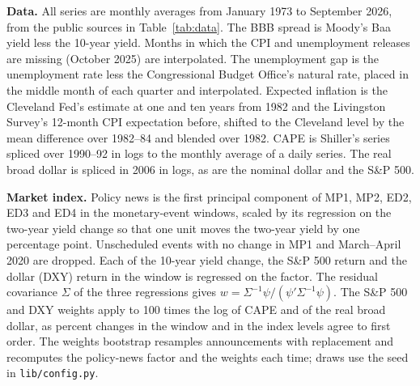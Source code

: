 \documentclass[11pt]{article}
\begin{document}
\begin{appendices}
\textbf{Data.} All series are monthly averages from January 1973 to September 2026, from the public sources in Table~\ref{tab:data}. The BBB spread is Moody's Baa yield less the 10-year yield. Months in which the CPI and unemployment releases are missing (October 2025) are interpolated. The unemployment gap is the unemployment rate less the Congressional Budget Office's natural rate, placed in the middle month of each quarter and interpolated. Expected inflation is the Cleveland Fed's estimate at one and ten years from 1982 and the Livingston Survey's 12-month CPI expectation before, shifted to the Cleveland level by the mean difference over 1982--84 and blended over 1982. CAPE is Shiller's series spliced over 1990--92 in logs to the monthly average of a daily series. The real broad dollar is spliced in 2006 in logs, as are the nominal dollar and the S\&P 500.

\textbf{Market index.} Policy news is the first principal component of MP1, MP2, ED2, ED3 and ED4 in the monetary-event windows, scaled by its regression on the two-year yield change so that one unit moves the two-year yield by one percentage point. Unscheduled events with no change in MP1 and March--April 2020 are dropped. Each of the 10-year yield change, the S\&P 500 return and the dollar (DXY) return in the window is regressed on the factor. The residual covariance $\Sigma$ of the three regressions gives $w=\Sigma^{-1}\psi/(\psi'\Sigma^{-1}\psi)$. The S\&P 500 and DXY weights apply to 100 times the log of CAPE and of the real broad dollar, as percent changes in the window and in the index levels agree to first order. The weights bootstrap resamples announcements with replacement and recomputes the policy-news factor and the weights each time; draws use the seed in \texttt{lib/config.py}.


\end{appendices}
\end{document}
